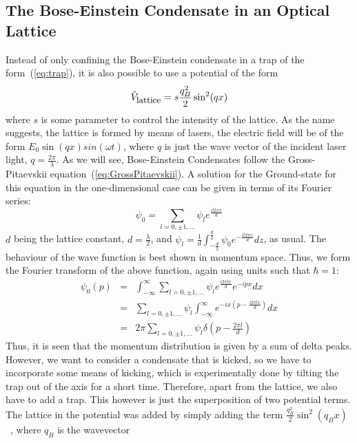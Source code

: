 \subsection{The Bose-Einstein Condensate in an Optical Lattice}\label{sec:lattice}
Instead of only confining the Bose-Einstein condensate in a trap of the form~(\ref{eq:trap}), it is also possible to use a potential of the form 
\begin{equation}\label{eq:trap}
	\hat{V}_{\textrm{\small lattice}} = s\frac{q_B^2}{2}\sin^2(qx)
\end{equation}
where $s$ is some parameter to control the intensity of the lattice. As the name suggests, the lattice is formed by means of lasers, the electric field will be of
the form $E_0\sin(qx)sin(\omega t)$, where $q$ is just the wave vector of the incident laser
light, $q=\frac{2\pi}{\lambda}$. As we will see, Bose-Einstein Condensates follow the Gross-Pitaevskii equation~(\ref{eq:GrossPitaevskii}). 
A solution for the
Ground-state for this equation in the one-dimensional case can be given in terms of its Fourier series:
\begin{equation}\label{eq:latticegs}
	\psi_0=\sum_{l=0,\pm 1, \ldots}\psi_le^{\frac{il2\pi x}{d}}
\end{equation}
$d$ being the lattice constant, $d=\frac{\lambda}{2}$, and $\psi_l=\frac{1}{d}\int_{-\frac{d}{2}}^{\frac{d}{2}}\psi_0e^{-\frac{il2\pi x}{d}}dz$, as usual. The behaviour of
the wave function is best shown in momentum space. Thus, we form the Fourier transform of the above function, again using units such that $\hbar=1$:
\begin{eqnarray}
	\psi_0(p)&=&\int_{-\infty}^{\infty}\sum_{l=0,\pm 1, \ldots}\psi_le^{\frac{i2\pi l x}{d}}e^{-ipx}dx\nonumber\\
		{}&=&\sum_{l=0,\pm 1, \ldots}\psi_l\int_{-\infty}^{\infty}e^{-ix(p-\frac{i2\pi l x}{d})}dx\nonumber\\
		{}&=&2\pi\sum_{l=0,\pm 1, \ldots}\psi_l\delta(p-\frac{2\pi l}{d})\nonumber
\end{eqnarray}
Thus, it is seen that the momentum distribution is given by a sum of delta peaks. However, we want to consider a condensate that is kicked, so we have to incorporate some means of kicking, which is
experimentally done by tilting the trap out of the axis for a short time. Therefore, apart from the lattice, we also have to add a trap. This however is just the superposition of 
two potential terms. 
The lattice in the potential was added by simply adding the term $\frac{q_B^2}{2}\sin^2(q_Bx)$~\cite{menotti}, where $q_B$ is the wavevector 
